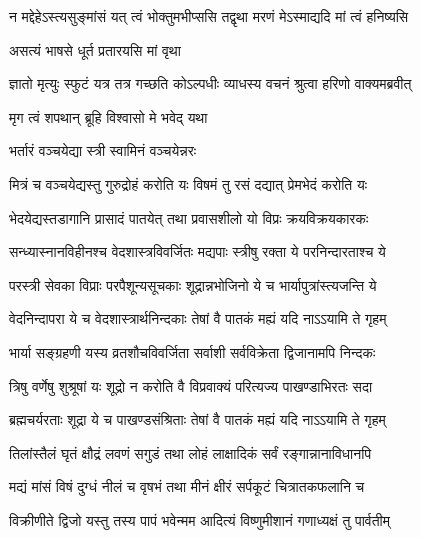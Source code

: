 \twolineshloka
{न मद्देहेऽस्त्यसुङ्मांसं यत् त्वं भोक्तुमभीप्ससि}
{तद्वृथा मरणं मेऽस्माद्यदि मां त्वं हनिष्यसि}%


\onelineshloka
{असत्यं भाषसे धूर्त प्रतारयसि मां वृथा}%

\twolineshloka
{ज्ञातो मृत्युः स्फुटं यत्र तत्र गच्छति कोऽल्पधीः}
{व्याधस्य वचनं श्रुत्वा हरिणो वाक्यमब्रवीत्}%



\onelineshloka
{मृग त्वं शपथान् ब्रूहि विश्वासो मे भवेद् यथा}%




\onelineshloka
{भर्तारं वञ्चयेद्या स्त्री स्वामिनं वञ्चयेन्नरः}%

\twolineshloka
{मित्रं च वञ्चयेद्यस्तु गुरुद्रोहं करोति यः}
{विषमं तु\footnotemark{} रसं दद्यात् प्रेमभेदं करोति यः}%

\twolineshloka
{भेदयेद्यस्तडागानि प्रासादं पातयेत् तथा}
{प्रवासशीलो यो विप्रः क्रयविक्रयकारकः}%

\twolineshloka
{सन्ध्यास्नानविहीनश्च वेदशास्त्रविवर्जितः}
{मद्यपाः स्त्रीषु रक्ता ये परनिन्दारताश्च ये}%

\twolineshloka
{परस्त्री सेवका विप्राः परपैशून्यसूचकाः}
{शूद्रान्नभोजिनो ये च भार्यापुत्रांस्त्यजन्ति ये}%

\twolineshloka
{वेदनिन्दापरा ये च वेदशास्त्रार्थनिन्दकाः}
{तेषां वै पातकं मह्यं यदि नाऽऽयामि ते गृहम्}%

\twolineshloka
{भार्या सङ्ग्रहणी यस्य व्रतशौचविवर्जिता}
{सर्वाशी सर्वविक्रेता द्विजानामपि निन्दकः}%

\twolineshloka
{त्रिषु वर्णेषु शुश्रूषां यः शूद्रो न करोति वै}
{विप्रवाक्यं परित्यज्य पाखण्डाभिरतः सदा}%

\twolineshloka
{ब्रह्मचर्यरताः शूद्रा ये च पाखण्डसंश्रिताः}
{तेषां वै पातकं मह्यं यदि नाऽऽयामि ते गृहम्}%

\twolineshloka
{तिलांस्तैलं घृतं क्षौद्रं लवणं सगुडं तथा}
{लोहं लाक्षादिकं सर्वं रङ्गान्नानाविधानपि}%

\twolineshloka
{मद्यं मांसं विषं दुग्धं नीलं च वृषभं तथा}
{मीनं क्षीरं सर्पकूटं चित्रातकफलानि च}%

\twolineshloka
{विक्रीणीते द्विजो यस्तु तस्य पापं भवेन्मम}
{आदित्यं विष्णुमीशानं गणाध्यक्षं तु पार्वतीम्}%

